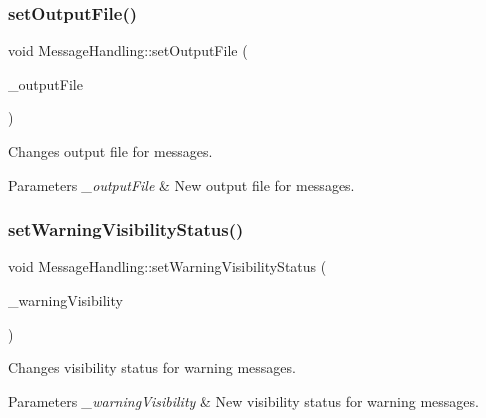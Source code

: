 \subsubsection{\texorpdfstring{set\+Output\+File()}{setOutputFile()}}
{\footnotesize\ttfamily void Message\+Handling\+::set\+Output\+File (\begin{DoxyParamCaption}\item[{F\+I\+LE $\ast$}]{\+\_\+output\+File }\end{DoxyParamCaption})\hspace{0.3cm}{\ttfamily [inline]}}

Changes output file for messages. 
\begin{DoxyParams}{Parameters}
{\em \+\_\+output\+File} & New output file for messages. \\
\hline
\end{DoxyParams}
\mbox{\label{class_message_handling_aaa411b35b599fe59c57b94e0eb0f2728}} 
\subsubsection{\texorpdfstring{set\+Warning\+Visibility\+Status()}{setWarningVisibilityStatus()}}
{\footnotesize\ttfamily void Message\+Handling\+::set\+Warning\+Visibility\+Status (\begin{DoxyParamCaption}\item[{\hyperlink{_types_8hpp_a36503475bb1fea0a7fd7087259ee63c1}{Visibility\+Status}}]{\+\_\+warning\+Visibility }\end{DoxyParamCaption})\hspace{0.3cm}{\ttfamily [inline]}}

Changes visibility status for warning messages. 
\begin{DoxyParams}{Parameters}
{\em \+\_\+warning\+Visibility} & New visibility status for warning messages. \\
\hline
\end{DoxyParams}
\mbox{\label{class_message_handling_a257d3209e0efcb245753be9d9f89e4cf}} 
